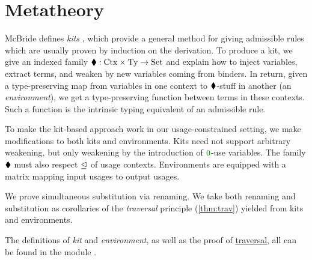 \documentclass[submission,copyright,creativecommons]{eptcs}
\begin{document}

\section{Metatheory}\label{sec:metatheory}

McBride defines \emph{kits} \cite{rensub05,bhkm12}, which provide a general
method for giving admissible rules which are usually proven by induction on the
derivation.
To produce a kit, we give an indexed family
$\mathbin{\blacklozenge} : \mathrm{Ctx} \times \mathrm{Ty} \to \mathrm{Set}$ and explain how to
inject variables, extract terms, and weaken by new variables coming from
binders.
In return, given a type-preserving map from variables in one context to
$\mathbin{\blacklozenge}$-stuff in another (an \emph{environment}), we get a type-preserving
function between terms in these contexts.
Such a function is the intrinsic typing equivalent of an admissible rule.

To make the kit-based approach work in our usage-constrained setting, we make
modifications to both kits and environments.
Kits need not support arbitrary weakening, but only weakening by the
introduction of $\rescomment 0$-use variables.
The family $\mathbin{\blacklozenge}$ must also respect $\trianglelefteq$ of usage contexts.
Environments are equipped with a matrix mapping input usages to output usages.

We prove simultaneous substitution via renaming.
We take both renaming and substitution as corollaries of the \emph{traversal}
principle (\autoref{thm:trav}) yielded from kits and environments.

The definitions of \emph{kit} and \emph{environment}, as well as the proof of
\hyperref[thm:trav]{traversal}, all can be found in the module
.

\end{document}
